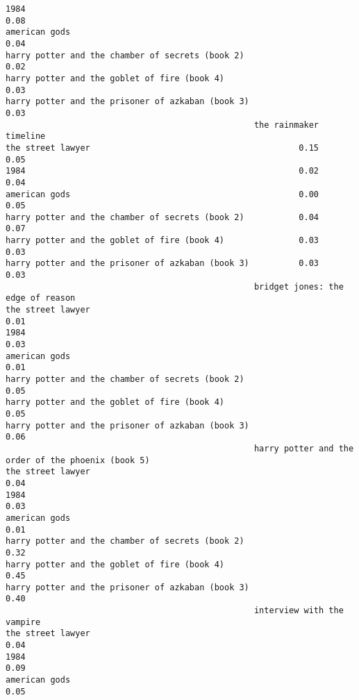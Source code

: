 \documentclass[
]{report}
\begin{document}
\begin{verbatim}
1984                                                                                          0.08
american gods                                                                                 0.04
harry potter and the chamber of secrets (book 2)                                              0.02
harry potter and the goblet of fire (book 4)                                                  0.03
harry potter and the prisoner of azkaban (book 3)                                             0.03
                                                  the rainmaker timeline
the street lawyer                                          0.15     0.05
1984                                                       0.02     0.04
american gods                                              0.00     0.05
harry potter and the chamber of secrets (book 2)           0.04     0.07
harry potter and the goblet of fire (book 4)               0.03     0.03
harry potter and the prisoner of azkaban (book 3)          0.03     0.03
                                                  bridget jones: the edge of reason
the street lawyer                                                              0.01
1984                                                                           0.03
american gods                                                                  0.01
harry potter and the chamber of secrets (book 2)                               0.05
harry potter and the goblet of fire (book 4)                                   0.05
harry potter and the prisoner of azkaban (book 3)                              0.06
                                                  harry potter and the order of the phoenix (book 5)
the street lawyer                                                                               0.04
1984                                                                                            0.03
american gods                                                                                   0.01
harry potter and the chamber of secrets (book 2)                                                0.32
harry potter and the goblet of fire (book 4)                                                    0.45
harry potter and the prisoner of azkaban (book 3)                                               0.40
                                                  interview with the vampire
the street lawyer                                                       0.04
1984                                                                    0.09
american gods                                                           0.05

\end{verbatim}
\end{document}
